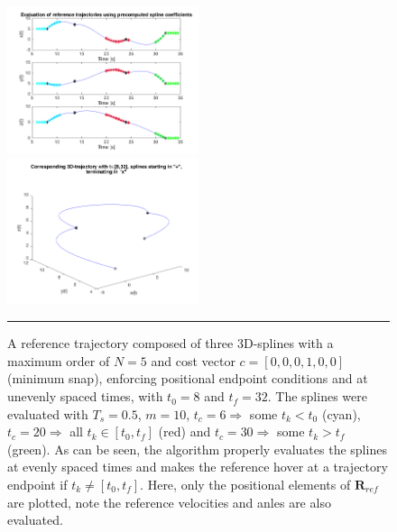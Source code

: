 \documentclass{article}
\begin{document}
\begin{figure}[htbp]
\centering
\includegraphics[width=0.5\textwidth]{figures/Trajectory.png}%
\includegraphics[width=0.5\textwidth]{figures/Trajectory3d.png}
\rule{35em}{0.5pt}
\caption{A reference trajectory composed of three 3D-splines with a maximum order of $N = 5$ and cost vector $c = [0,0,0,1,0,0]$ (minimum snap), enforcing positional endpoint conditions and at unevenly spaced times, with $t_0=8$ and $t_f=32$. The splines were evaluated with $T_s = 0.5$, $m = 10$, $t_c = 6\Rightarrow$ some $t_k < t_0$ (cyan), $t_c = 20\Rightarrow$ all $t_k\in[t_0,t_f]$ (red) and $t_c = 30\Rightarrow$ some $t_k > t_f$ (green). As can be seen, the algorithm properly evaluates the splines at evenly spaced times and makes the reference hover at a trajectory endpoint if $t_k\neq[t_0,t_f]$. Here, only the positional elements of $\mathbf{R}_{ref}$ are plotted, note the reference velocities and anles are also evaluated. }
\label{fig:trajectory}
\end{figure}
\end{document}
